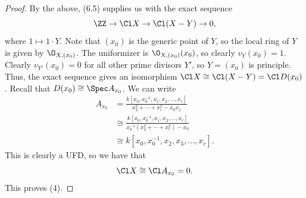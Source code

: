 \documentclass[12pt]{amsart}
\begin{document}
\begin{proof}
  By the above, (6.5) supplies us with the exact sequence
  \[
    \ZZ\to \Cl X\to \Cl (X-Y)\to 0,
  \] 
  where $1\mapsto 1\cdot Y$.
  Note that $(x_0)$ is the generic point of $Y$, so the local ring of $Y$ is given by $\O_{X,(x_0)}$.
  The uniformizer is $\O_{X,(x_0)}(x_0)$, so clearly $v_Y(x_0)=1$.
  Clearly $v_{Y'}(x_0)=0$ for all other prime divisors $Y'$, so $Y=(x_0)$ is principle.
  Thus, the exact sequence gives an isomorphism $\Cl X\cong \Cl (X-Y)=\Cl D(x_0)$.
  Recall that $D(x_0)\cong \Spec A_{x_0}$.
  We can write
  \begin{align*}
    A_{x_0}&=\frac{k[x_0,x_0^{-1},x_1,x_2,\ldots,x_r]}{x_2^2+\cdots +x_r^2 - x_0x_1} \\
           &\cong \frac{k[x_0,x_0^{-1},x_1,x_2,\ldots,x_r]}{x_0^{-1}(x_2^2+\cdots +x_r^2) - x_0} \\
           &\cong k[x_0,x_0^{-1},x_2,x_3,\ldots,x_r].
  \end{align*}
  This is clearly a UFD, so we have that
  \[
    \Cl X\cong \Cl A_{x_0}=0.
  \] 
  This proves (4).

\end{proof}
\end{document}
